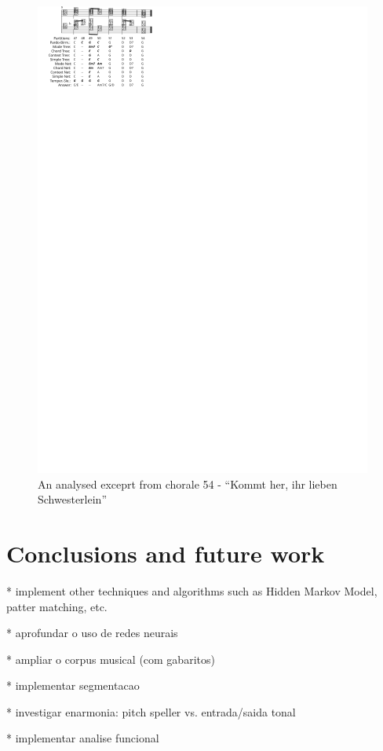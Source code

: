 \documentclass{article}
\begin{document}
\begin{figure}
  \centering
  \includegraphics[scale=4]{coral-054}
  \caption{An analysed exceprt from chorale 54 - ``Kommt her, ihr lieben Schwesterlein''}
  \label{fig:coral-54}
\end{figure}


\section{Conclusions and future work}
\label{sec:concl-future-work}


* implement other techniques and algorithms such as Hidden Markov
Model, patter matching, etc.

* aprofundar o uso de redes neurais

* ampliar o corpus musical (com gabaritos)

* implementar segmentacao

* investigar enarmonia: pitch speller vs. entrada/saida tonal

* implementar analise funcional



\end{document}
